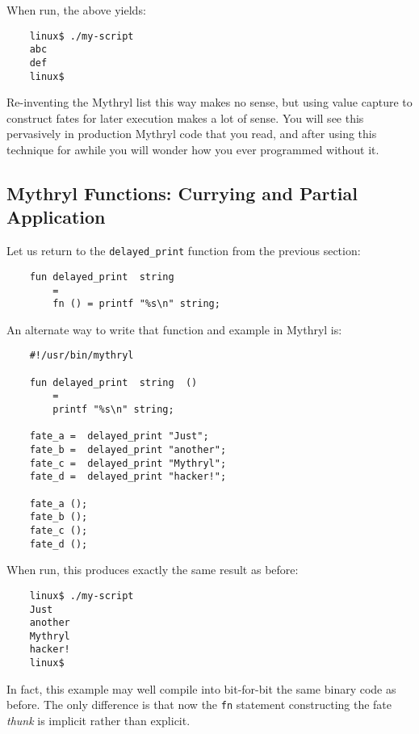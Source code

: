 When run, the above yields:

\begin{verbatim}
    linux$ ./my-script
    abc
    def
    linux$ 
\end{verbatim}
     
Re-inventing the Mythryl list this way makes no sense, but using value 
capture to construct fates for later execution makes 
a lot of sense.  You will see this pervasively in production Mythryl 
code that you read, and after using this technique for awhile you will 
wonder how you ever programmed without it.

\cutend*

\subsection{Mythryl Functions:  Currying and Partial Application}

Let us return to the {\tt delayed\_print} function from the 
previous section:

\begin{verbatim}
    fun delayed_print  string
        =
        fn () = printf "%s\n" string;
\end{verbatim}

An alternate way to write that function and example in Mythryl is:

\begin{verbatim}
    #!/usr/bin/mythryl

    fun delayed_print  string  ()
        =
        printf "%s\n" string;

    fate_a =  delayed_print "Just";
    fate_b =  delayed_print "another";
    fate_c =  delayed_print "Mythryl";
    fate_d =  delayed_print "hacker!";

    fate_a ();
    fate_b ();
    fate_c ();
    fate_d ();
\end{verbatim}

When run, this produces exactly the same result as before:

\begin{verbatim}
    linux$ ./my-script
    Just
    another
    Mythryl
    hacker!
    linux$
\end{verbatim}

In fact, this example may well compile into bit-for-bit the same binary 
code as before.  The only difference is that now the {\tt fn} statement 
constructing the fate {\it thunk} is implicit rather than explicit. 


